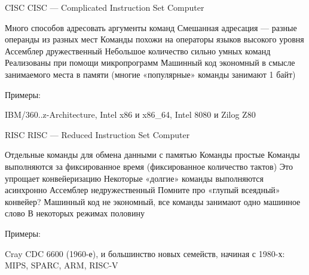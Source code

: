 \documentclass[xetex,aspectratio=43]{beamer}
\begin{document}
\begin{frame}{CISC}
    CISC — Complicated Instruction Set Computer

    \begin{outline}[itemize]
        \1 Много способов адресовать аргументы команд
        \1 Смешанная адресация — разные операнды из разных мест
        \1 Команды похожи на операторы языков высокого уровня
        \1 Ассемблер дружественный
        \1 Небольшое количество сильно умных команд
        \1 Реализованы при помощи микропрограмм
        \1 Машинный код экономный в смысле занимаемого места в памяти (многие «популярные» команды занимают 1 байт)
    \end{outline}

    Примеры:

    IBM/360..z-Architecture, Intel x86 и x86\_64, Intel 8080 и Zilog Z80
\end{frame}

\begin{frame}{RISC}
    RISC — Reduced Instruction Set Computer

    \begin{outline}[itemize]
        \1 Отдельные команды для обмена данными с памятью
        \1 Команды простые
            \2 Команды выполняются за фиксированное время (фиксированное количество тактов)
            \2 Это упрощает конвейеризацию
        \1 Некоторые «долгие» команды выполняются асинхронно
        \1 Ассемблер недружественный
            \2 Помните про «глупый всеядный» конвейер?
        \1 Машинный код не экономный, все команды занимают одно машинное слово
            \2 В некоторых режимах половину
    \end{outline}

    Примеры:

    Cray CDC 6600 (1960-е), и большинство новых семейств, начиная с 1980-х: MIPS, SPARC, ARM, RISC-V
\end{frame}
\end{document}
